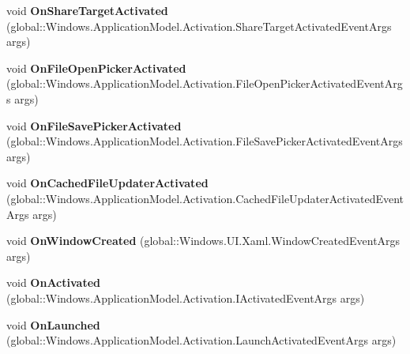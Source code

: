 \begin{DoxyCompactItemize}
void {\bfseries On\+Share\+Target\+Activated} (global\+::\+Windows.\+Application\+Model.\+Activation.\+Share\+Target\+Activated\+Event\+Args args)
\item 
\mbox{\label{interface_windows_1_1_u_i_1_1_xaml_1_1_i_application_overrides_a9936f8d6d560846bd8afcc2caf52f817}} 
void {\bfseries On\+File\+Open\+Picker\+Activated} (global\+::\+Windows.\+Application\+Model.\+Activation.\+File\+Open\+Picker\+Activated\+Event\+Args args)
\item 
\mbox{\label{interface_windows_1_1_u_i_1_1_xaml_1_1_i_application_overrides_ac1045282cb352835c663f00f47f545c0}} 
void {\bfseries On\+File\+Save\+Picker\+Activated} (global\+::\+Windows.\+Application\+Model.\+Activation.\+File\+Save\+Picker\+Activated\+Event\+Args args)
\item 
\mbox{\label{interface_windows_1_1_u_i_1_1_xaml_1_1_i_application_overrides_ae742ea61ef4a57a981967d42b9269009}} 
void {\bfseries On\+Cached\+File\+Updater\+Activated} (global\+::\+Windows.\+Application\+Model.\+Activation.\+Cached\+File\+Updater\+Activated\+Event\+Args args)
\item 
\mbox{\label{interface_windows_1_1_u_i_1_1_xaml_1_1_i_application_overrides_ae5c60a74b6070b8b620b11c15d8a0d1e}} 
void {\bfseries On\+Window\+Created} (global\+::\+Windows.\+U\+I.\+Xaml.\+Window\+Created\+Event\+Args args)
\item 
\mbox{\label{interface_windows_1_1_u_i_1_1_xaml_1_1_i_application_overrides_a3d67b84df0aa6c2353ba9dfdf0711d43}} 
void {\bfseries On\+Activated} (global\+::\+Windows.\+Application\+Model.\+Activation.\+I\+Activated\+Event\+Args args)
\item 
\mbox{\label{interface_windows_1_1_u_i_1_1_xaml_1_1_i_application_overrides_ab33b8fe098161d6f117c096208d4caa4}} 
void {\bfseries On\+Launched} (global\+::\+Windows.\+Application\+Model.\+Activation.\+Launch\+Activated\+Event\+Args args)
\item 

\end{DoxyCompactItemize}
